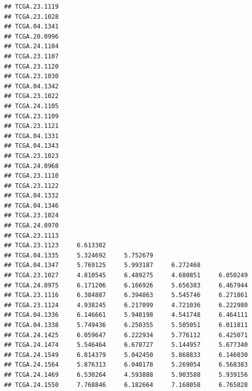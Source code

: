 \documentclass[UTF8]{beamer}\usepackage[]{graphicx}\usepackage[]{color}
\makeatletter
\newenvironment{kframe}{%
 \def\at@end@of@kframe{}%
 \ifinner\ifhmode%
  \def\at@end@of@kframe{\end{minipage}}%
  \begin{minipage}{\columnwidth}%
 \fi\fi%
 \def\FrameCommand##1{\hskip\@totalleftmargin \hskip-\fboxsep
 \colorbox{shadecolor}{##1}\hskip-\fboxsep
     \hskip-\linewidth \hskip-\@totalleftmargin \hskip\columnwidth}%
 \MakeFramed {\advance\hsize-\width
   \@totalleftmargin\z@ \linewidth\hsize
   \@setminipage}}%
 {\par\unskip\endMakeFramed%
 \at@end@of@kframe}
\newenvironment{knitrout}{}{} %
\makeatother
\begin{document}
\begin{frame}[fragile]
\begin{knitrout}
\begin{kframe}
\begin{verbatim}
## TCGA.23.1119                                                    
## TCGA.23.1028                                                    
## TCGA.04.1341                                                    
## TCGA.20.0996                                                    
## TCGA.24.1104                                                    
## TCGA.23.1107                                                    
## TCGA.23.1120                                                    
## TCGA.23.1030                                                    
## TCGA.04.1342                                                    
## TCGA.23.1022                                                    
## TCGA.24.1105                                                    
## TCGA.23.1109                                                    
## TCGA.23.1121                                                    
## TCGA.04.1331                                                    
## TCGA.04.1343                                                    
## TCGA.23.1023                                                    
## TCGA.24.0968                                                    
## TCGA.23.1110                                                    
## TCGA.23.1122                                                    
## TCGA.04.1332                                                    
## TCGA.04.1346                                                    
## TCGA.23.1024                                                    
## TCGA.24.0970                                                    
## TCGA.23.1113                                                    
## TCGA.23.1123     6.613302                                       
## TCGA.04.1335     5.324692     5.752679                          
## TCGA.04.1347     5.769125     5.993187     6.272468             
## TCGA.23.1027     4.810545     6.489275     4.680851     6.050249
## TCGA.24.0975     6.171206     6.166926     5.656383     6.467944
## TCGA.23.1116     6.384887     6.394863     5.545746     6.271861
## TCGA.23.1124     4.938245     6.217099     4.721036     6.222980
## TCGA.04.1336     6.146661     5.940198     4.541748     6.464111
## TCGA.04.1338     5.749436     6.250355     5.505051     6.011811
## TCGA.24.1425     6.059647     6.222934     5.776112     6.425071
## TCGA.24.1474     5.546464     6.678727     5.144957     5.677340
## TCGA.24.1549     6.814379     5.042450     5.868833     6.146030
## TCGA.24.1564     5.876313     6.040178     5.269054     6.568383
## TCGA.24.1469     6.530264     4.593888     5.903588     5.939156
## TCGA.24.1550     7.768846     6.182664     7.168058     6.765828

\end{verbatim}
\end{kframe}
\end{knitrout}
\end{frame}
\end{document}
